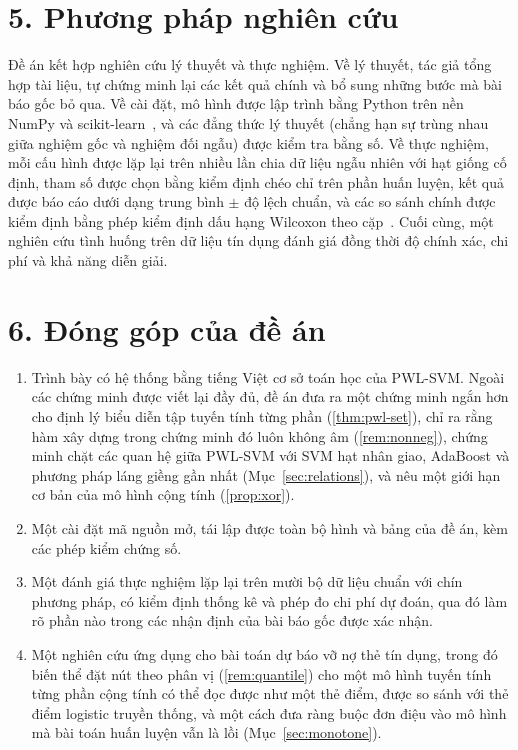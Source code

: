 \section*{5. Phương pháp nghiên cứu}

Đề án kết hợp nghiên cứu lý thuyết và thực nghiệm. Về lý thuyết, tác giả tổng hợp tài liệu, tự chứng minh lại các kết quả chính và bổ sung những bước mà bài báo gốc bỏ qua. Về cài đặt, mô hình được lập trình bằng Python trên nền NumPy và scikit-learn~\cite{pedregosa2011}, và các đẳng thức lý thuyết (chẳng hạn sự trùng nhau giữa nghiệm gốc và nghiệm đối ngẫu) được kiểm tra bằng số. Về thực nghiệm, mỗi cấu hình được lặp lại trên nhiều lần chia dữ liệu ngẫu nhiên với hạt giống cố định, tham số được chọn bằng kiểm định chéo chỉ trên phần huấn luyện, kết quả được báo cáo dưới dạng trung bình $\pm$ độ lệch chuẩn, và các so sánh chính được kiểm định bằng phép kiểm định dấu hạng Wilcoxon theo cặp~\cite{demsar2006}. Cuối cùng, một nghiên cứu tình huống trên dữ liệu tín dụng đánh giá đồng thời độ chính xác, chi phí và khả năng diễn giải.

\section*{6. Đóng góp của đề án}

\begin{enumerate}[label=(\arabic*)]
\item Trình bày có hệ thống bằng tiếng Việt cơ sở toán học của PWL-SVM. Ngoài các chứng minh được viết lại đầy đủ, đề án đưa ra một chứng minh ngắn hơn cho định lý biểu diễn tập tuyến tính từng phần (\cref{thm:pwl-set}), chỉ ra rằng hàm xây dựng trong chứng minh đó luôn không âm (\cref{rem:nonneg}), chứng minh chặt các quan hệ giữa PWL-SVM với SVM hạt nhân giao, AdaBoost và phương pháp láng giềng gần nhất (Mục~\ref{sec:relations}), và nêu một giới hạn cơ bản của mô hình cộng tính (\cref{prop:xor}).
\item Một cài đặt mã nguồn mở, tái lập được toàn bộ hình và bảng của đề án, kèm các phép kiểm chứng số.
\item Một đánh giá thực nghiệm lặp lại trên mười bộ dữ liệu chuẩn với chín phương pháp, có kiểm định thống kê và phép đo chi phí dự đoán, qua đó làm rõ phần nào trong các nhận định của bài báo gốc được xác nhận.
\item Một nghiên cứu ứng dụng cho bài toán dự báo vỡ nợ thẻ tín dụng, trong đó biến thể đặt nút theo phân vị (\cref{rem:quantile}) cho một mô hình tuyến tính từng phần cộng tính có thể đọc được như một thẻ điểm, được so sánh với thẻ điểm logistic truyền thống, và một cách đưa ràng buộc đơn điệu vào mô hình mà bài toán huấn luyện vẫn là lồi (Mục~\ref{sec:monotone}).
\end{enumerate}

